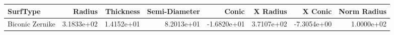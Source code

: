\begin{tabular}{lrrrrrrr}
\toprule
       SurfType &     Radius &  Thickness &  Semi-Diameter &       Conic &   X Radius &     X Conic &  Norm Radius \\
\midrule
Biconic Zernike & 3.1833e+02 & 1.4152e+01 &     8.2013e+01 & -1.6820e+01 & 3.7107e+02 & -7.3054e+00 &   1.0000e+02 \\
\bottomrule
\end{tabular}
